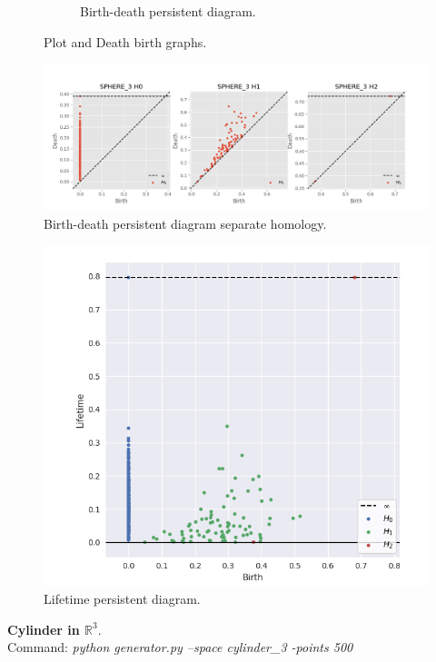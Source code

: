 \documentclass[11pt,a4paper]{report}
\begin{document}
\begin{figure}[H]
\begin{subfigure}[b]{0.45\linewidth}
                  \caption{Birth-death persistent diagram.}
                \end{subfigure}
                \caption{Plot and Death birth graphs.}
                \label{fig: plot death}
              \end{figure}

              \begin{figure}[H]
                \centering
                \includegraphics[width=\linewidth]{./ripser/on_sphere_sep_homology.PNG}
                \caption{Birth-death persistent diagram separate homology.}
                \label{fig:sep hom}
              \end{figure}

              \begin{figure}[H]
                \centering
                \includegraphics[width=0.5\linewidth, scale=0.5]{./ripser/on_sphere_lifetime.PNG}
                \caption{Lifetime persistent diagram.}
                \label{fig:sep hom}
              \end{figure}

              \textbf{Cylinder in $\mathbb{R}^3$}.\\
              Command: \textit{python generator.py --space cylinder\_3 -points 500}
\end{document}
